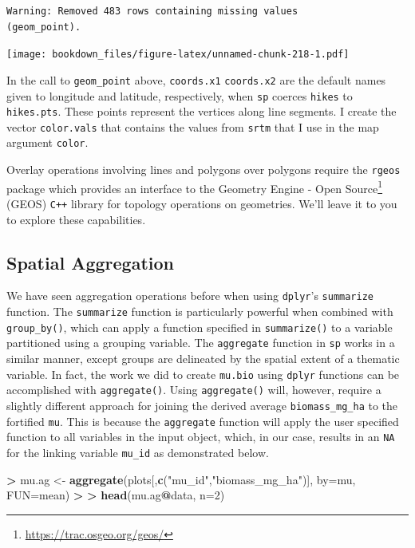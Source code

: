 \documentclass[]{krantz}
\makeatletter
\newenvironment{Shaded}{\begin{snugshade}}{\end{snugshade}}
\newcommand{\KeywordTok}[1]{\textcolor[rgb]{0.27,0.27,0.27}{\textbf{#1}}}
\newcommand{\DataTypeTok}[1]{\textcolor[rgb]{0.27,0.27,0.27}{#1}}
\newcommand{\DecValTok}[1]{\textcolor[rgb]{0.06,0.06,0.06}{#1}}
\newcommand{\StringTok}[1]{\textcolor[rgb]{0.5,0.5,0.5}{#1}}
\newcommand{\OperatorTok}[1]{\textcolor[rgb]{0.43,0.43,0.43}{\textbf{#1}}}
\newcommand{\ErrorTok}[1]{\textcolor[rgb]{0.14,0.14,0.14}{\textbf{#1}}}
\newcommand{\NormalTok}[1]{#1}
\renewcommand{\href}[2]{#2\footnote{\url{#1}}}
\newenvironment{kframe}{%
\medskip{}
\setlength{\fboxsep}{.8em}
 \def\at@end@of@kframe{}%
 \ifinner\ifhmode%
  \def\at@end@of@kframe{\end{minipage}}%
  \begin{minipage}{\columnwidth}%
 \fi\fi%
 \def\FrameCommand##1{\hskip\@totalleftmargin \hskip-\fboxsep
 \colorbox{shadecolor}{##1}\hskip-\fboxsep
     \hskip-\linewidth \hskip-\@totalleftmargin \hskip\columnwidth}%
 \MakeFramed {\advance\hsize-\width
   \@totalleftmargin\z@ \linewidth\hsize
   \@setminipage}}%
 {\par\unskip\endMakeFramed%
 \at@end@of@kframe}
\renewenvironment{Shaded}{\begin{kframe}}{\end{kframe}}
\makeatother
\begin{document}
\begin{verbatim}
Warning: Removed 483 rows containing missing values
(geom_point).
\end{verbatim}

\texttt{[image: bookdown\_files/figure-latex/unnamed-chunk-218-1.pdf]}

In the call to \texttt{geom\_point} above, \texttt{coords.x1}
\texttt{coords.x2} are the default names given to longitude and
latitude, respectively, when \texttt{sp} coerces \texttt{hikes} to
\texttt{hikes.pts}. These points represent the vertices along line
segments. I create the vector \texttt{color.vals} that contains the
values from \texttt{srtm} that I use in the map argument \texttt{color}.

Overlay operations involving lines and polygons over polygons require
the \texttt{rgeos} package which provides an interface to the
\href{https://trac.osgeo.org/geos/}{Geometry Engine - Open Source}
(GEOS) \texttt{C++} library for topology operations on geometries. We'll
leave it to you to explore these capabilities.

\subsection{Spatial Aggregation}\label{spatial-aggregation}

We have seen aggregation operations before when using \texttt{dplyr}'s
\texttt{summarize} function. The \texttt{summarize} function is
particularly powerful when combined with \texttt{group\_by()}, which can
apply a function specified in \texttt{summarize()} to a variable
partitioned using a grouping variable. The \texttt{aggregate} function
in \texttt{sp} works in a similar manner, except groups are delineated
by the spatial extent of a thematic variable. In fact, the work we did
to create \texttt{mu.bio} using \texttt{dplyr} functions can be
accomplished with \texttt{aggregate()}. Using \texttt{aggregate()} will,
however, require a slightly different approach for joining the derived
average \texttt{biomass\_mg\_ha} to the fortified \texttt{mu}. This is
because the \texttt{aggregate} function will apply the user specified
function to all variables in the input object, which, in our case,
results in an \texttt{NA} for the linking variable \texttt{mu\_id} as
demonstrated below.

\begin{Shaded}
\begin{Highlighting}[]
\OperatorTok{>}\StringTok{ }\NormalTok{mu.ag <-}\StringTok{ }\KeywordTok{aggregate}\NormalTok{(plots[,}\KeywordTok{c}\NormalTok{(}\StringTok{"mu_id"}\NormalTok{,}\StringTok{"biomass_mg_ha"}\NormalTok{)], }\DataTypeTok{by=}\NormalTok{mu, }\DataTypeTok{FUN=}\NormalTok{mean)}
\OperatorTok{>}\StringTok{ }
\ErrorTok{>}\StringTok{ }\KeywordTok{head}\NormalTok{(mu.ag}\OperatorTok{@}\NormalTok{data, }\DataTypeTok{n=}\DecValTok{2}\NormalTok{)}
\end{Highlighting}
\end{Shaded}
\end{document}
